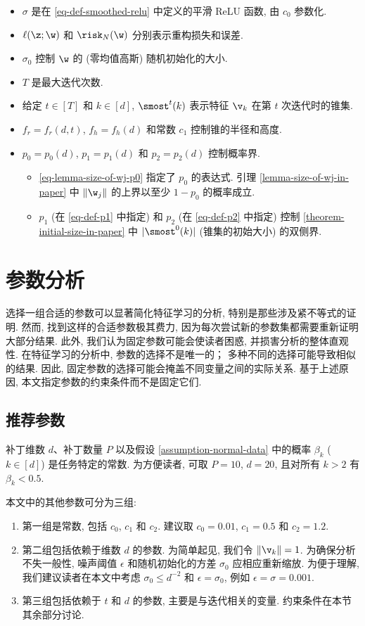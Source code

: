 \begin{itemize}
    \item $\sigma$ 是在 \ref{eq-def-smoothed-relu} 中定义的平滑 ReLU 函数, 由 $c_0$ 参数化. 
    \item $\ell(\z;\w)$ 和 $\risk_N(\w)$ 分别表示重构损失和误差. 
    \item $\sigma_0$ 控制 $\w$ 的 (零均值高斯) 随机初始化的大小. 
    \item $T$ 是最大迭代次数. 
    \item 给定 $t \in [T]$ 和 $k \in [d]$, $\smost^t(k)$ 表示特征 $\v_k$ 在第 $t$ 次迭代时的锥集. 
    \item $f_r = f_r(d,t)$, $f_h = f_h(d)$ 和常数 $c_1$ 控制锥的半径和高度. 
    \item $p_0 = p_0(d)$, $p_1 = p_1(d)$ 和 $p_2 = p_2(d)$ 控制概率界. 
    \begin{itemize}
        \item \ref{eq-lemma-size-of-wj-p0} 指定了 $p_0$ 的表达式. 
        引理 \ref{lemma-size-of-wj-in-paper} 中 $\|\w_j\|$ 的上界以至少 $1 - p_0$ 的概率成立. 
        \item $p_1$ (在 \ref{eq-def-p1} 中指定) 和 $p_2$ (在 \ref{eq-def-p2} 中指定) 控制 \ref{theorem-initial-size-in-paper} 中 $|\smost^{0}(k)|$ (锥集的初始大小) 的双侧界. 
    \end{itemize}
    
\end{itemize}

\section{参数分析}\label{sec-parameters}
选择一组合适的参数可以显著简化特征学习的分析, 特别是那些涉及紧不等式的证明. 
然而, 找到这样的合适参数极其费力, 因为每次尝试新的参数集都需要重新证明大部分结果. 
此外, 我们认为固定参数可能会使读者困惑, 并损害分析的整体直观性. 
在特征学习的分析中, 参数的选择不是唯一的； 
多种不同的选择可能导致相似的结果. 
因此, 固定参数的选择可能会掩盖不同变量之间的实际关系. 
基于上述原因, 本文指定参数的约束条件而不是固定它们. 

\subsection{推荐参数}
补丁维数 $d$、补丁数量 $P$ 以及假设 \ref{assumption-normal-data} 中的概率 $\beta_k$ ($k\in [d]$) 是任务特定的常数. 
为方便读者, 可取 $P = 10$, $d = 20$, 且对所有 $k > 2$ 有 $\beta_k < 0.5$. 

本文中的其他参数可分为三组: 
\begin{enumerate}
    \item 第一组是常数, 包括 $c_0$, $c_1$ 和 $c_2$. 建议取 $c_0 = 0.01$, $c_1 = 0.5$ 和 $c_2 = 1.2$. 
    \item 第二组包括依赖于维数 $d$ 的参数. 
    为简单起见, 我们令 $\|\v_k\|=1$. 
    为确保分析不失一般性, {噪声阈值} $\epsilon$ 和随机初始化的方差 $\sigma_0$ 应相应重新缩放. 
    为便于理解, 我们建议读者在本文中考虑 $\sigma_0 \leq d^{-2}$ 和 $\epsilon = \sigma_0$, 例如 $\epsilon = \sigma = 0.001$. 
    \item 第三组包括依赖于 $t$ 和 $d$ 的参数, 主要是与迭代相关的变量. 约束条件在本节其余部分讨论. 
\end{enumerate}

